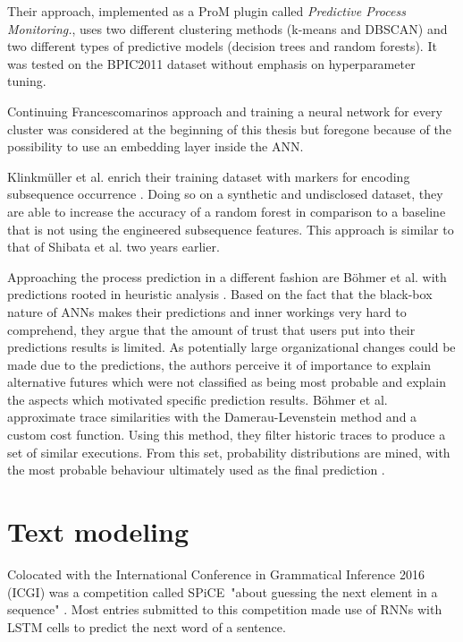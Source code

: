 Their approach, implemented as a ProM plugin called \textit{Predictive Process Monitoring.}, uses two different clustering methods (k-means and DBSCAN) and two different types of predictive models (decision trees and random forests). It was tested on the BPIC2011 dataset \cite{BPIC2011} without emphasis on hyperparameter tuning.

Continuing Francescomarinos approach and training a neural network for every cluster was considered at the beginning of this thesis but foregone because of the possibility to use an embedding layer inside the ANN.\\

Klinkmüller et al. enrich their training dataset with markers for encoding subsequence occurrence \cite{klinkmuller2018reliablemonitoring}. Doing so on a synthetic and undisclosed dataset, they are able to increase the accuracy of a random forest in comparison to a baseline that is not using the engineered subsequence features. This approach is similar to that of Shibata et al. \cite{shibata2016bipartite} two years earlier.

Approaching the process prediction in a different fashion are Böhmer et al. with predictions rooted in heuristic analysis \cite{boehmer2018probability}. Based on the fact that the black-box nature of ANNs makes their predictions and inner workings very hard to comprehend, they argue that the amount of trust that users put into their predictions results is limited. As potentially large organizational changes could be made due to the predictions, the authors perceive it of importance to explain alternative futures which were not classified as being most probable and explain the aspects which motivated specific prediction results.
Böhmer et al. approximate trace similarities with the Damerau-Levenstein method and a custom cost function. Using this method, they filter historic traces to produce a set of similar executions. From this set, probability distributions are mined, with the most probable behaviour ultimately used as the final prediction \cite{boehmer2018probability}.

\section{Text modeling}
Colocated with the International Conference in Grammatical Inference 2016 (ICGI) was a competition called SPiCE\ "about guessing the next element in a sequence" \cite{web:spice}. Most entries submitted to this competition made use of RNNs with LSTM cells to predict the next word of a sentence.

